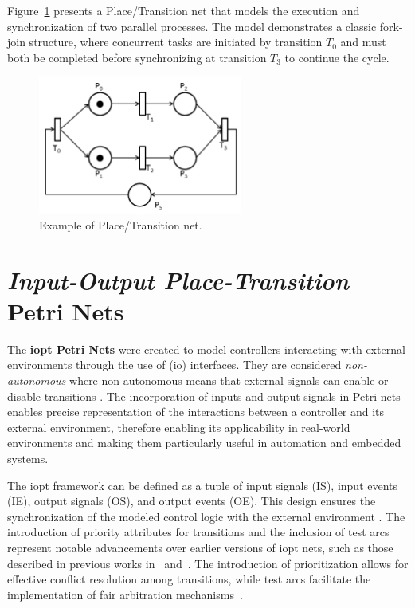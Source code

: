 Figure~\ref{fig:petrinet} presents a Place/Transition net that models the execution and synchronization of two parallel processes. The model demonstrates a classic fork-join structure, where concurrent tasks are initiated by transition $T_0$ and must both be completed before synchronizing at transition $T_3$ to continue the cycle.


\begin{figure}[htbp]
  \centering
  \includegraphics[width=0.6\textwidth]{Chapters/Figures/petriNetExemplo.jpg}
  \caption{Example of Place/Transition net.}
  \label{fig:petrinet}
\end{figure}

\section{\emph{Input-Output Place-Transition} Petri Nets}
\label{sec:iopt_petri_nets}


The \textbf{\gls{iopt} Petri Nets} were created to model controllers interacting with external environments through the use of (\gls{io}) interfaces\cite{iopttools}. They are considered \emph{non-autonomous}  where non-autonomous means that external signals can enable or disable transitions \cite{2015gomes}. The incorporation of inputs and output signals in Petri nets enables precise representation of the interactions between a controller and its external environment, therefore enabling its applicability in real-world environments  and making them particularly useful in automation and embedded systems\cite{iopttools}.


The \gls{iopt} framework can be defined as a tuple of input signals (IS), input events (IE), output signals (OS), and output events (OE). This design ensures the synchronization of the modeled control logic with the external environment \cite{iopttools}. The introduction of priority attributes for transitions and the inclusion of test arcs represent notable advancements over earlier versions of \gls{iopt} nets, such as those described in previous works in~\cite{barros2004} and~\cite{bg2005}. The introduction of prioritization allows for effective conflict resolution among transitions, while test arcs facilitate the implementation of fair arbitration mechanisms~\cite{conflict}.

